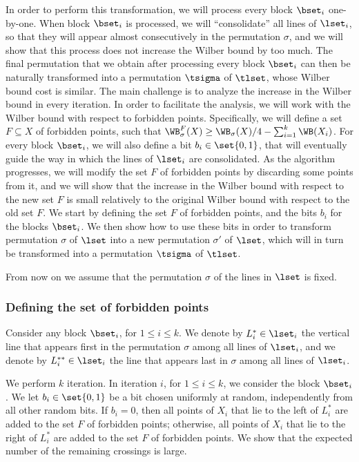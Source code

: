 \documentclass{toc}
\begin{document}
In order to perform this transformation, we will process every block $\bset_i$ one-by-one. When block $\bset_i$ is processed, we will ``consolidate'' all lines of $\lset_i$, so that they will appear almost consecutively in the permutation $\sigma$, and we will show that this process does not increase the Wilber bound by too much. The final permutation that we obtain after processing every block $\bset_i$ can then be naturally transformed into a permutation $\tsigma$ of $\tlset$, whose Wilber bound cost is similar. The main challenge is to analyze the increase in the Wilber bound in every iteration. In order to facilitate the analysis, we will work with the Wilber bound with respect to forbidden points. Specifically, we will define a set $F\subseteq X$ of forbidden points, such that $\WB_{\sigma}^F(X)\geq \WB_{\sigma}(X)/4-\sum_{i=1}^k\WB(X_i)$. For every block $\bset_i$, we will also define a bit $b_i\in \set{0,1}$, that will eventually guide the way in which the lines of $\lset_i$ are consolidated. As the algorithm progresses, we will modify the set $F$ of forbidden points by discarding some points from it, and we will show that the increase in the Wilber bound with respect to the new set $F$ is small relatively to the original Wilber bound with respect to the old set $F$. We start by defining the set $F$ of forbidden points, and the bits $b_i$ for the blocks $\bset_i$. We then show how to use these bits in order to transform permutation $\sigma$ of $\lset$ into a new permutation $\sigma'$ of $\lset$, which will in turn be transformed into a permutation $\tsigma$ of $\tlset$.

From now on we assume that the permutation $\sigma$ of the lines in $\lset$ is fixed.

%
%
%
%
\subsubsection{Defining the set  of forbidden points}
%
%
%
%
Consider any block $\bset_i$, for $1\leq i\leq k$. We denote by $L^*_i\in \lset_i$ the vertical line that appears first in the permutation $\sigma$ among all lines of $\lset_i$, and we denote by $L^{**}_i\in \lset_i$ the line that appears last in $\sigma$ among all lines of $\lset_i$. 

We perform $k$ iteration. In iteration $i$, for $1\leq i\leq k$, we consider the block $\bset_i$. We let $b_i\in \set{0,1}$ be a bit chosen uniformly at random, independently from all other random bits. If $b_i=0$, then all points of $X_i$ that lie to the left of $L^*_i$ are added to the set $F$ of forbidden points; otherwise, all points of $X_i$ that lie to the right of $L^*_i$ are added to the set $F$ of forbidden points. We show that the expected number of the remaining crossings is large.
\end{document}
